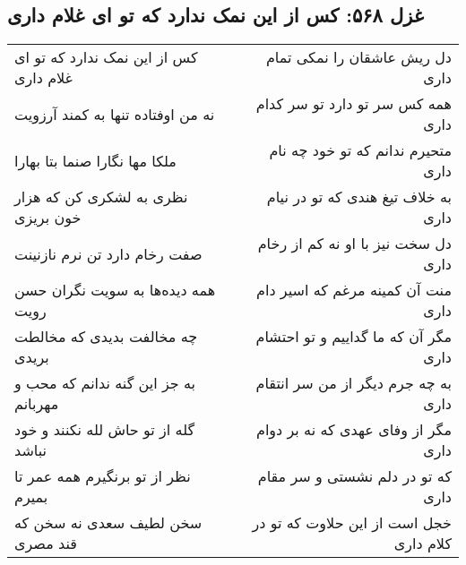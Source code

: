 \begin{center}
\section*{غزل ۵۶۸: کس از این نمک ندارد که تو ای غلام داری}
\label{sec:568}
\begin{longtable}{l p{0.5cm} r}
کس از این نمک ندارد که تو ای غلام داری
&&
دل ریش عاشقان را نمکی تمام داری
\\
نه من اوفتاده تنها به کمند آرزویت
&&
همه کس سر تو دارد تو سر کدام داری
\\
ملکا مها نگارا صنما بتا بهارا
&&
متحیرم ندانم که تو خود چه نام داری
\\
نظری به لشکری کن که هزار خون بریزی
&&
به خلاف تیغ هندی که تو در نیام داری
\\
صفت رخام دارد تن نرم نازنینت
&&
دل سخت نیز با او نه کم از رخام داری
\\
همه دیده‌ها به سویت نگران حسن رویت
&&
منت آن کمینه مرغم که اسیر دام داری
\\
چه مخالفت بدیدی که مخالطت بریدی
&&
مگر آن که ما گداییم و تو احتشام داری
\\
به جز این گنه ندانم که محب و مهربانم
&&
به چه جرم دیگر از من سر انتقام داری
\\
گله از تو حاش لله نکنند و خود نباشد
&&
مگر از وفای عهدی که نه بر دوام داری
\\
نظر از تو برنگیرم همه عمر تا بمیرم
&&
که تو در دلم نشستی و سر مقام داری
\\
سخن لطیف سعدی نه سخن که قند مصری
&&
خجل است از این حلاوت که تو در کلام داری
\\
\end{longtable}
\end{center}
